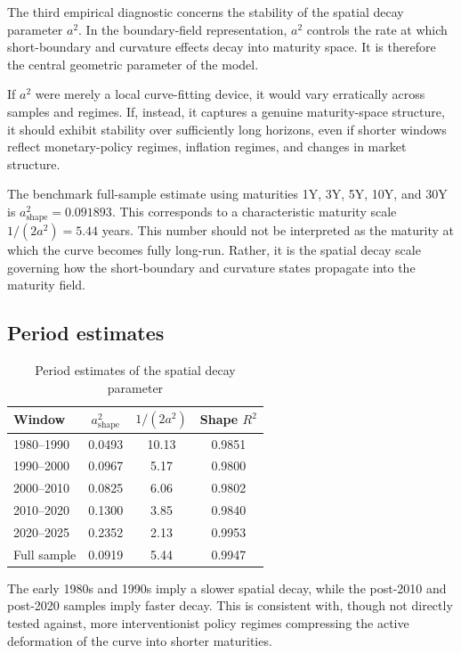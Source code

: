 \documentclass[11pt]{article}
\begin{document}
The third empirical diagnostic concerns the stability of the spatial decay parameter $a^2$. In the boundary-field representation, $a^2$ controls the rate at which short-boundary and curvature effects decay into maturity space. It is therefore the central geometric parameter of the model.

If $a^2$ were merely a local curve-fitting device, it would vary erratically across samples and regimes. If, instead, it captures a genuine maturity-space structure, it should exhibit stability over sufficiently long horizons, even if shorter windows reflect monetary-policy regimes, inflation regimes, and changes in market structure.

The benchmark full-sample estimate using maturities 1Y, 3Y, 5Y, 10Y, and 30Y is $a^2_{\mathrm{shape}}=0.091893$. This corresponds to a characteristic maturity scale $1/(2a^2)=5.44$ years. This number should not be interpreted as the maturity at which the curve becomes fully long-run. Rather, it is the spatial decay scale governing how the short-boundary and curvature states propagate into the maturity field.

\subsection{Period estimates}

\begin{table}[htbp]
\centering
\caption{Period estimates of the spatial decay parameter}
\label{tab:a2-periods}
\begin{tabular}{@{}lccc@{}}
\toprule
Window & $a^2_{\mathrm{shape}}$ & $1/(2a^2)$ & Shape $R^2$ \\
\midrule
1980--1990 & 0.0493 & 10.13 & 0.9851 \\
1990--2000 & 0.0967 & 5.17 & 0.9800 \\
2000--2010 & 0.0825 & 6.06 & 0.9802 \\
2010--2020 & 0.1300 & 3.85 & 0.9840 \\
2020--2025 & 0.2352 & 2.13 & 0.9953 \\
Full sample & 0.0919 & 5.44 & 0.9947 \\
\bottomrule
\end{tabular}
\end{table}

The early 1980s and 1990s imply a slower spatial decay, while the post-2010 and post-2020 samples imply faster decay. This is consistent with, though not directly tested against, more interventionist policy regimes compressing the active deformation of the curve into shorter maturities.
\end{document}
